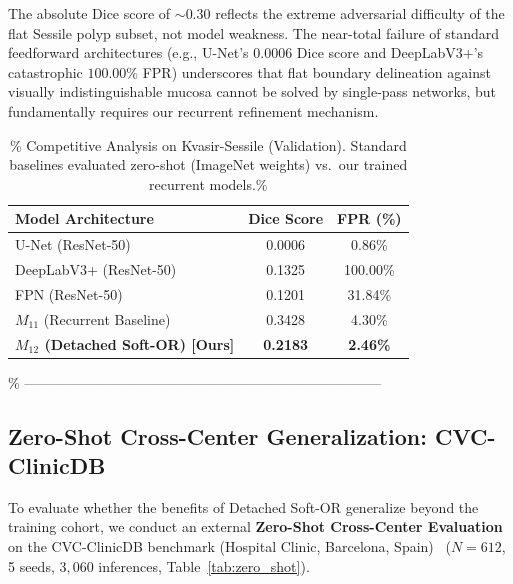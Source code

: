 The absolute Dice score of $\sim 0.30$ reflects the extreme adversarial
difficulty of the flat Sessile polyp subset, not model weakness.
The near-total failure of standard feedforward architectures (e.g., U-Net's
$0.0006$ Dice score and DeepLabV3+'s catastrophic $100.00\%$ FPR) underscores
that flat boundary delineation against visually indistinguishable mucosa
cannot be solved by single-pass networks, but fundamentally requires our
recurrent refinement mechanism.

\begin{table}[t!]
\centering
\caption{\%
  Competitive Analysis on Kvasir-Sessile (Validation). Standard
  baselines evaluated zero-shot (ImageNet weights) vs.\ our trained
  recurrent models.\%
}
\label{tab:sota_compare}
\setlength{\tabcolsep}{6pt}
\begin{tabular}{l c c}
\toprule
\textbf{Model Architecture}                    & \textbf{Dice Score} & \textbf{FPR (\%)} \\
\midrule
U-Net (ResNet-50)                              & 0.0006              & 0.86\%            \\
DeepLabV3+ (ResNet-50)                         & 0.1325              & 100.00\%          \\
FPN (ResNet-50)                                & 0.1201              & 31.84\%           \\
$M_{11}$ (Recurrent Baseline)                  & 0.3428              & 4.30\%            \\
\midrule
\textbf{$M_{12}$ (Detached Soft-OR) [Ours]}   & \textbf{0.2183}     & \textbf{2.46\%}   \\
\bottomrule
\end{tabular}
\end{table}

\% -----------------------------------------------------------------------------
\subsection{Zero-Shot Cross-Center Generalization: CVC-ClinicDB}
To evaluate whether the benefits of Detached Soft-OR generalize beyond
the training cohort, we conduct an external \textbf{Zero-Shot
Cross-Center Evaluation} on the CVC-ClinicDB benchmark (Hospital
Clinic, Barcelona, Spain)~\cite{bernal2017comparative} ($N = 612$,
5 seeds, $3{,}060$ inferences, Table~\ref{tab:zero_shot}).

